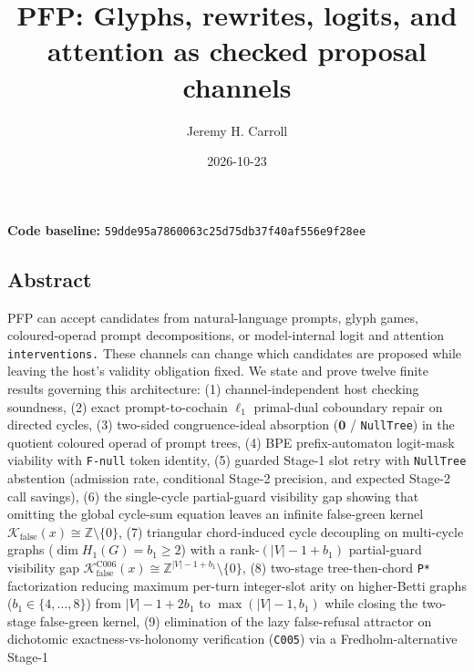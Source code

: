 \documentclass[
  11pt,
]{article}
\title{PFP: Glyphs, rewrites, logits, and attention as checked proposal
channels}
\author{Jeremy H. Carroll}
\date{2026-10-23}
\newcommand{\passthrough}[1]{#1}
\begin{document}
\makeatletter
\begin{center}
{\LARGE \@title\par}
\vspace{0.8em}
{\normalsize \@author\par}
\vspace{0.5em}
{\small \@date\par}
\end{center}
\makeatother

\textbf{Code baseline:}
\nolinkurl{59dde95a7860063c25d75db37f40af556e9f28ee}

\subsection{Abstract}\label{abstract}

PFP can accept candidates from natural-language prompts, glyph games,
coloured-operad prompt decompositions, or model-internal logit and
attention \nolinkurl{interventions.} These channels can change which
candidates are proposed while leaving the host's validity obligation
fixed. We state and prove twelve finite results governing this
architecture: (1) channel-independent host checking soundness, (2) exact
prompt-to-cochain \(\ell_1\) primal-dual coboundary repair on directed
cycles, (3) two-sided congruence-ideal absorption (\(\mathbf{0}\) /
\passthrough{\lstinline!NullTree!}) in the quotient coloured operad of
prompt trees, (4) BPE prefix-automaton logit-mask viability with
\passthrough{\lstinline!F-null!} token identity, (5) guarded Stage-1
slot retry with \passthrough{\lstinline!NullTree!} abstention (admission
rate, conditional Stage-2 precision, and expected Stage-2 call savings),
(6) the single-cycle partial-guard visibility gap showing that omitting
the global cycle-sum equation leaves an infinite false-green kernel
\(\mathcal{K}_{\text{false}}(x) \cong \mathbb{Z} \setminus \{0\}\), (7)
triangular chord-induced cycle decoupling on multi-cycle graphs
(\(\dim H_1(G) = b_1 \ge 2\)) with a rank-\((|V|-1+b_1)\) partial-guard
visibility gap
\(\mathcal{K}_{\text{false}}^{\text{C006}}(x) \cong \mathbb{Z}^{|V|-1+b_1} \setminus \{0\}\),
(8) two-stage tree-then-chord \passthrough{\lstinline!P*!} factorization
reducing maximum per-turn integer-slot arity on higher-Betti graphs
(\(b_1 \in \{4,\allowbreak  \dots,\allowbreak  8\}\)) from
\(|V|-1+2 b_1\) to \(\max(|V|-1,\allowbreak  b_1)\) while closing the
two-stage false-green kernel, (9) elimination of the lazy false-refusal
attractor on dichotomic exactness-vs-holonomy verification
(\passthrough{\lstinline!C005!}) via a Fredholm-alternative Stage-1
\end{document}
